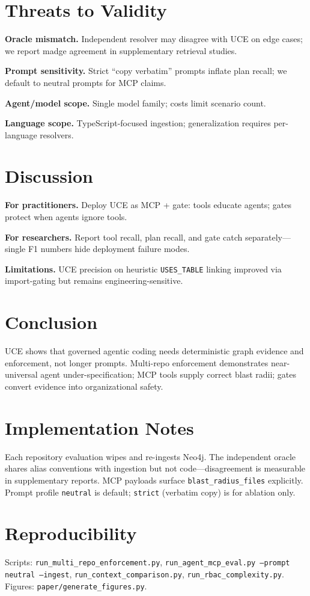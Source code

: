\documentclass[conference]{IEEEtran}
\begin{document}
\section{Threats to Validity}
\label{sec:threats}

\textbf{Oracle mismatch.} Independent resolver may disagree with UCE on edge cases; we report madge agreement in supplementary retrieval studies.

\textbf{Prompt sensitivity.} Strict ``copy verbatim'' prompts inflate plan recall; we default to neutral prompts for MCP claims.

\textbf{Agent/model scope.} Single model family; costs limit scenario count.

\textbf{Language scope.} TypeScript-focused ingestion; generalization requires per-language resolvers.

\section{Discussion}
\label{sec:discussion}

\textbf{For practitioners.} Deploy UCE as MCP + gate: tools educate agents; gates protect when agents ignore tools.

\textbf{For researchers.} Report tool recall, plan recall, and gate catch separately---single F1 numbers hide deployment failure modes.

\textbf{Limitations.} UCE precision on heuristic \texttt{USES\_TABLE} linking improved via import-gating but remains engineering-sensitive.

\section{Conclusion}
\label{sec:conclusion}

UCE shows that governed agentic coding needs deterministic graph evidence and enforcement, not longer prompts.
Multi-repo enforcement demonstrates near-universal agent under-specification; MCP tools supply correct blast radii; gates convert evidence into organizational safety.

\section{Implementation Notes}
\label{sec:impl}

Each repository evaluation wipes and re-ingests Neo4j. The independent oracle shares alias conventions with ingestion but not code---disagreement is measurable in supplementary reports. MCP payloads surface \texttt{blast\_radius\_files} explicitly. Prompt profile \texttt{neutral} is default; \texttt{strict} (verbatim copy) is for ablation only.

\section*{Reproducibility}
Scripts: \texttt{run\_multi\_repo\_enforcement.py}, \texttt{run\_agent\_mcp\_eval.py --prompt neutral --ingest}, \texttt{run\_context\_comparison.py}, \texttt{run\_rbac\_complexity.py}. Figures: \texttt{paper/generate\_figures.py}.



\end{document}
